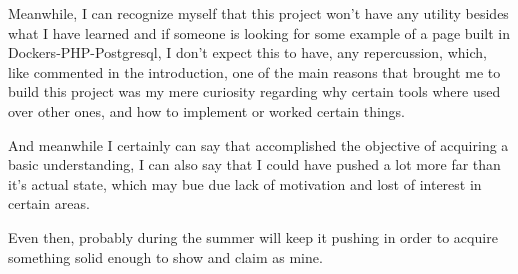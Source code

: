 \begin{flushleft}
    Meanwhile, I can recognize myself that this project won't have any utility besides what I have learned and if
    someone is looking for some example of a page built in Dockers-PHP-Postgresql, I don't expect this to have,
    any repercussion, which, like commented in the introduction, one of the main reasons that brought me to build this
    project was my mere curiosity regarding why certain tools where used over other ones, and how to implement or worked
    certain things.
\end{flushleft}
\begin{flushleft}
    And meanwhile I certainly can say that accomplished the objective of acquiring a basic understanding, I can also say
    that I could have pushed a lot more far than it's actual state, which may bue due lack of motivation and lost of
    interest in certain areas.
\end{flushleft}
\begin{flushleft}
    Even then, probably during the summer will keep it pushing in order to acquire something solid enough to show and
    claim as mine.
\end{flushleft}